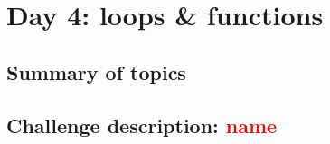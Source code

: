 \chapter{Day 4: loops \& functions}

\section{Summary of topics}

\section{Challenge description: \textcolor{red}{name}}
